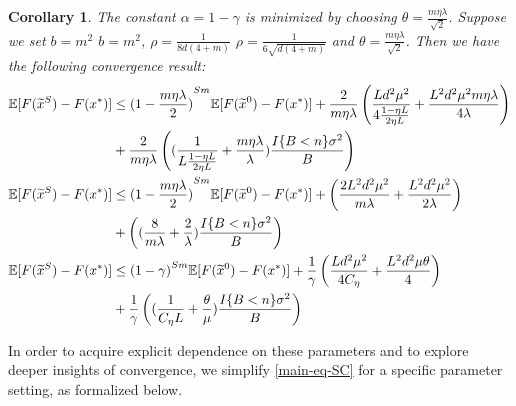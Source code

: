 \documentclass{article}
\newcommand*{\E}{\mathbb{E}}
\newtheorem{corollary}[theorem]{Corollary}
\theoremstyle{definition}
\theoremstyle{remark}
\begin{document}
\begin{corollary}
 The constant $\alpha = 1-\gamma$ is minimized by choosing $\theta = \frac{m\eta\lambda}{\sqrt{2}}$. Suppose we set $b = m^2$ {\color{brown}$b=m^2$}, $\rho = \frac{1}{8d(4+m)}$ {\color{Brown}$\rho = \frac{1}{6\sqrt{d(4+m)}}$ }and $\theta = \frac{m\eta\lambda}{\sqrt{2}}$. Then we have the following convergence result:
\begin{align}
\E[F(\widetilde{x}^S) - F(x^*)] & \leq {(1-\frac{m\eta\lambda}{2})}^{Sm} \E[F(\widetilde{x}^0) - F(x^*)]+\frac{2}{{m\eta\lambda}}\left(\frac{Ld^2\mu^2}{4\frac{1-\eta L}{2\eta L}}+\frac{ L^2d^2\mu^2m\eta\lambda}{4\lambda}\right)\notag\\
&+ \frac{2}{m\eta\lambda}\left((\frac{1}{L\frac{1-\eta L}{2\eta L}}+\frac{m\eta\lambda}{\lambda})\frac{I\{B < n\} \sigma ^2}{B}\right)\\
\E[F(\widetilde{x}^S) - F(x^*)] & \leq {(1-\frac{m\eta\lambda}{2})}^{Sm} \E[F(\widetilde{x}^0) - F(x^*)]+\left(\frac{2L^2d^2\mu^2}{m\lambda}+\frac{ L^2d^2\mu^2}{2\lambda}\right)\notag\\
&+ \left((\frac{8}{m\lambda}+\frac{2}{\lambda})\frac{I\{B < n\} \sigma ^2}{B}\right)\\
\E[F(\widetilde{x}^S) - F(x^*)] & \leq {(1-\gamma)}^{Sm} \E[F(\widetilde{x}^0) - F(x^*)]+\frac{1}{{\gamma}}\left(\frac{Ld^2\mu^2}{4C_{\eta}}+\frac{ L^2d^2\mu\theta}{4}\right)\notag\\
&+ \frac{1}{\gamma}\left((\frac{1}{C_{\eta} L}+\frac{\theta}{\mu})\frac{I\{B < n\} \sigma ^2}{B}\right)
\end{align}
\end{corollary}
In order
to acquire explicit dependence on these parameters and to explore deeper insights of convergence, we
simplify \eqref{main-eq-SC} for a specific parameter setting, as formalized below.
\end{document}
